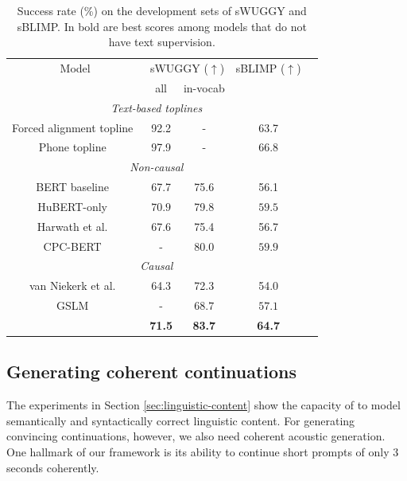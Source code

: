 \documentclass[letterpaper,10 pt]{IEEEtran}
\begin{document}
\begin{table}[t]
    \centering
    \caption{Success rate (\%) on the development sets of sWUGGY and sBLIMP. In bold are best scores among models that do not have text supervision.}
    \begin{tabular}{ccccc}
    \toprule
     Model & \multicolumn{2}{c}{sWUGGY ($\uparrow$)} & sBLIMP ($\uparrow$)   \\
     & all & in-vocab & \\

    \midrule
    \multicolumn{4}{c}{\textit{Text-based toplines}} \\
    \midrule[0.3pt]
    Forced alignment topline~\cite{zerospeech21} & 92.2 & - & 63.7 \\
    Phone topline~\cite{zerospeech21} & 97.9 & - & 66.8 \\
    \midrule
    \multicolumn{4}{c}{\textit{Non-causal}} \\
    \midrule[0.3pt]
    BERT baseline~\cite{zerospeech21} &  67.7 & 75.6 &  56.1 \\
    HuBERT-only~\cite{nguyentextless2022} &  $70.9$ & 79.8 & $59.5$ \\
    Harwath et al.~\cite{Peng2022} & 67.6 & 75.4 &  56.7 \\
    CPC-BERT~\cite{nguyentextless2022} &  - & $80.0$ & $59.9$ \\
    \midrule
    \multicolumn{4}{c}{\textit{Causal}} \\
    \midrule[0.3pt]
    van Niekerk et al.~\cite{Niekerk2021} & 64.3 & 72.3 & 54.0 \\
    GSLM~\cite{lakhotia2021generative} & - &  $68.7$ &  $57.1$\\
    \ours{} & \textbf{71.5} & \textbf{83.7} &  \textbf{64.7}	\\
    \bottomrule
    \end{tabular}
    \label{tab:swuggy_sblimp}
\end{table}



\subsection{Generating coherent continuations} \label{sec:prompt-continuation}
The experiments in Section \ref{sec:linguistic-content} show the capacity of \ours{} to model semantically and syntactically correct linguistic content. For generating convincing continuations, however, we also need coherent acoustic generation. One hallmark of our framework is its ability to continue short prompts of only 3 seconds coherently. 
\end{document}
